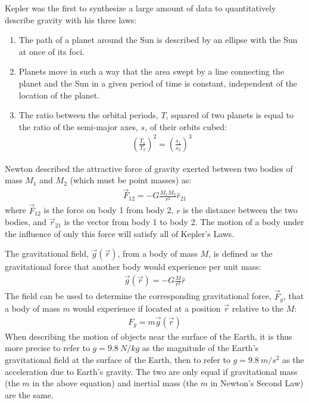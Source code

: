 \begin{chapterSummary}
Kepler was the first to synthesize a large amount of data to quantitatively describe gravity with his three laws:
\begin{enumerate}
\item The path of a planet around the Sun is described by an ellipse with the Sun at once of its foci.
\item Planets move in such a way that the area swept by a line connecting the planet and the Sun in a given period of time is constant, independent of the location of the planet.
\item The ratio between the orbital periods, $T$, squared of two planets is equal to the ratio of the semi-major axes, $s$, of their orbits cubed:
\begin{align*}
\left(\frac{T_1}{T_2}\right)^2=\left(\frac{s_1}{s_2}\right)^3
\end{align*}
\end{enumerate}

Newton described the attractive force of gravity exerted between two bodies of mass $M_1$ and $M_2$ (which must be point masses) as:
\begin{align*}
\vec F_{12}=-G\frac{M_1M_2}{r^2}\hat r_{21}
\end{align*}
where $\vec F_{12}$ is the force on body 1 from body 2, $r$ is the distance between the two bodies, and $\vec r_{21}$ is the vector from body 1 to body 2. The motion of a body under the influence of only this force will satisfy all of Kepler's Laws.

The gravitational field, $\vec g(\vec r)$, from a body of mass $M$, is defined as the gravitational force that another body would experience per unit mass:
\begin{align*}
\vec g(\vec r)=-G\frac{M}{r^2}\hat r
\end{align*}
The field can be used to determine the corresponding gravitational force, $\vec F_g$, that a body of mass $m$ would experience if located at a position $\vec r$ relative to the $M$:
\begin{align*}
F_g = m \vec g(\vec r)
\end{align*}
When describing the motion of objects near the surface of the Earth, it is thus more precise to refer to $g=\SI{9.8}{N/kg}$ as the magnitude of the Earth's gravitational field at the surface of the Earth, then to refer to $g=\SI{9.8}{m/s^2}$ as the acceleration due to Earth's gravity. The two are only equal if gravitational mass (the $m$ in the above equation) and inertial mass (the $m$ in Newton's Second Law) are the same. 


\end{chapterSummary}
